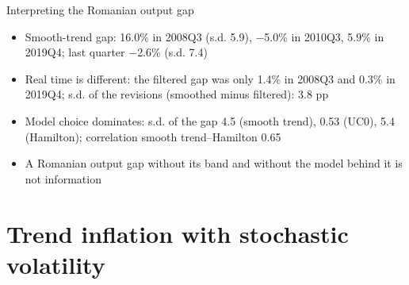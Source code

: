 \begin{frame}{Interpreting the Romanian output gap}
\itemsize{\small}
\begin{itemize}
    \item Smooth-trend gap: 16.0\% in 2008Q3 (s.d. 5.9), \ensuremath{-}5.0\% in 2010Q3, 5.9\% in 2019Q4; last quarter \ensuremath{-}2.6\% (s.d. 7.4)
    \item Real time is different: the filtered gap was only 1.4\% in 2008Q3 and 0.3\% in 2019Q4; s.d. of the revisions (smoothed minus filtered): 3.8 pp 
    \item Model choice dominates: s.d. of the gap 4.5 (smooth trend), 0.53 (UC0), 5.4 (Hamilton); correlation smooth trend--Hamilton 0.65
    \item A Romanian output gap without its band and without the model behind it is not information
\end{itemize}
\end{frame}


\section{Trend inflation with stochastic volatility}

